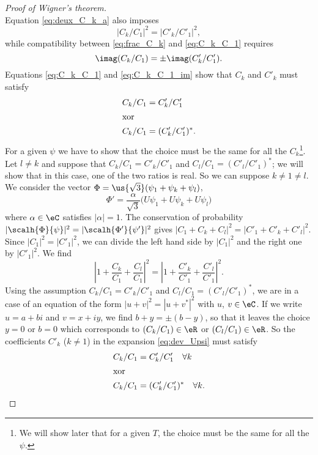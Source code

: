 \begin{proof}[Proof of Wigner's theorem]
\begin{equation}
	\end{equation}
	Equation \eqref{eq:deux_C_k_a} also imposes
	\begin{equation}\label{eq:frac_C_k}
		|C_k/C_1|^2=|C'_k/C'_1|^2,
	\end{equation}
	while compatibility between \eqref{eq:frac_C_k} and \eqref{eq:C_k_C_1} requires
	\begin{equation}\label{eq:C_k_C_1_im}
		\imag(C_k/C_1)=\pm\imag(C'_k/C'_1).
	\end{equation}
	Equations \eqref{eq:C_k_C_1} and \eqref{eq:C_k_C_1_im} show that $C_k$ and $C'_k$ must satisfy
	\begin{subequations}
		\begin{align}
			C_k/C_1 & =C'_k/C'_1      \\
			\intertext{xor}
			C_k/C_1 & =(C'_k/C'_1)^*.
		\end{align}
	\end{subequations}
	For a given $\psi$ we have to show that the choice must be the same for all the $C_k$\footnote{We will show later that for a given $T$, the choice must be the same for all the $\psi$.}. Let $l\neq k$ and suppose that $C_k/C_1=C'_k/C'_1$ and $C_l/C_1=(C'_l/C'_1)^*$; we will show that in this case, one of the two ratios is real. So we can suppose $k\neq 1\neq l$. We consider the vector $\Phi=\us{\sqrt 3}(\psi_1+\psi_k+\psi_l)$,
	\[
		\Phi'=\frac{\alpha}{\sqrt 3}\big( U\psi_1+U\psi_k+U\psi_l  \big)
	\]
	where $\alpha\in\eC$ satisfies $|\alpha|=1$. The conservation of probability $|\scalh{\Phi}{\psi}|^2=|\scalh{\Phi'}{\psi'}|^2$ gives $|C_1+C_k+C_l|^2=|C'_1+C'_k+C'_l|^2$. Since $|C_1|^2=|C'_1|^2$, we can divide the left hand side by $|C_1|^2$ and the right one by $|C'_1|^2$. We find
	\[
		\left|1+\frac{C_k}{C_1}+\frac{C_l}{C_1}\right|^2=\left|1+\frac{C'_k}{C'_1}+\frac{C'_l}{C'_1}\right|^2.
	\]
	Using the assumption $C_k/C_1=C'_k/C'_1$ and $C_l/C_1=(C'_l/C'_1)^*$, we are in a case of an equation of the form $|u+v|^2=|u+v^*|^2$ with $u$, $v\in\eC$. If we write $u=a+bi$ and $v=x+iy$, we find $b+y=\pm(b-y)$, so that it leaves the choice $y=0$ or $b=0$ which corresponds to $(C_k/C_1)\in\eR$ or $(C_l/C_1)\in\eR$. So the coefficients $C'_k$ ($k\neq 1$) in the expansion \eqref{eq:dev_Upsi} must satisfy
	\begin{subequations}
		\begin{align}
			C_k/C_1 & =C'_k/C'_1\quad\forall k \label{eq:rap_C_a}       \\
			\intertext{xor}
			C_k/C_1 & =(C'_k/C'_1)^*\quad\forall k  \label{eq:rap_C_b}.
		\end{align}

\end{subequations}
\end{proof}
